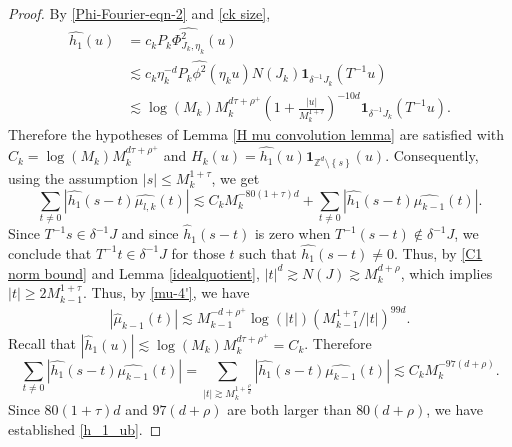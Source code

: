 \documentclass{amsart}
\numberwithin{equation}{section}
\theoremstyle{definition}
\theoremstyle{definition}
\def\ZZ{\mathbb{Z}}
\newcommand{\cbr}[1]{ \left\{ {#1} \right\} }
\def\one{\mathbf{1}}
\begin{document}
\begin{proof}
By \eqref{Phi-Fourier-eqn-2} and \eqref{ck size}, 
\begin{align*}
\widehat{h_1}(u) & = c_k P_k \widehat{\Phi_{J_k, \eta_k}^2}(u) \\
& \lesssim c_k \eta_k^{-d} P_k \widehat{\phi^2}(\eta_k u) N(J_k) \mathbf{1}_{\delta^{-1} J_k}  (T^{-1} u) \\
& \lesssim 
\log (M_k) 
M_k^{d \tau+\rho^+} 
\left(1 + \frac{|u|}{M_k^{1 + \tau}} \right)^{-10d} \mathbf{1}_{\delta^{-1} J_k}(T^{-1} u).
\end{align*}
%
Therefore the hypotheses of Lemma \ref{H mu convolution lemma} are satisfied with 
$C_k = \log (M_k) 
M_k^{d \tau+\rho^+}$  
and $H_k(u) = \widehat{h_1}(u) \one_{\ZZ^d \setminus \cbr{s}}(u)$.  
Consequently, using the assumption $|s| \leq M_k^{1+\tau}$, we get 
$$
\sum_{t \neq 0} |\widehat{h_1}(s-t) \widehat{\mu_{l,k}}(t)|
\lesssim C_k M_{k}^{-80(1+\tau)d} + \sum_{t \neq 0} |\widehat{h_1}(s-t) \widehat{\mu_{k-1}}(t)|. 
$$
Since $T^{-1}s \in \delta^{-1} J$ and since $\widehat{h}_1(s-t)$ is zero when $T^{-1}(s-t) \notin \delta^{-1} J$, we conclude that $T^{-1}t \in \delta^{-1} J$ for those $t$ such that $\widehat{h_1}(s - t) \neq 0$. 
Thus, by \eqref{C1 norm bound} and Lemma \ref{idealquotient}, 
$|t|^d \gtrsim N(J) \gtrsim M_k^{d+ \rho}$, 
which implies $|t| \geq 2M_{k-1}^{1+\tau}$. 
Thus, by \eqref{mu-4'}, we have
\begin{align*}
|\widehat{\mu}_{k-1}(t) | 
\lesssim 
M_{k-1}^{-d+\rho^+} 
\log(|t|)  ( M_{k-1}^{1+\tau} / |t|)^{99d}. 
\end{align*}
Recall that $|\widehat{h}_1 (u)| \lesssim \log(M_k) 
M_k^{d \tau + \rho^+} 
= C_k$. 
Therefore 
$$
\sum_{t \neq 0} |\widehat{h_1}(s-t) \widehat{\mu_{k-1}}(t)|
= 
\sum_{|t| \gtrsim M_k^{1+\frac{\rho}{d}}} |\widehat{h_1}(s-t) \widehat{\mu_{k-1}}(t)|
\lesssim C_k M_k^{-97(d + \rho)}. 
$$
Since $80(1+\tau)d$ and $97(d+\rho)$ are both larger than $80(d+\rho)$, 
we have established \eqref{h_1_ub}. 
\end{proof}
\end{document}
